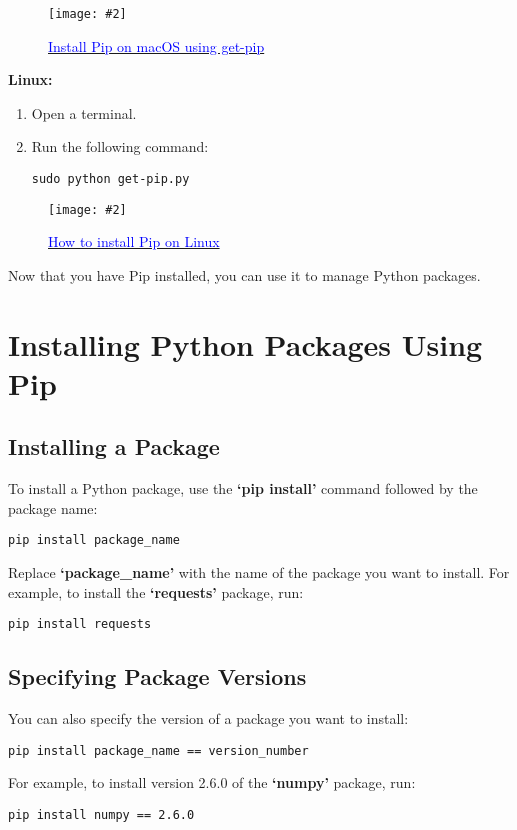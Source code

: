 \documentclass[a4paper, 12pt]{report}
\newcommand{\commandbox}[1]{%
    \begin{tcolorbox}[colback=green!10, colframe=green!50!black, rounded corners]
        #1
    \end{tcolorbox}%
}
\newcommand{\addimage}[4][]{%
    \begin{figure}[ht]
        \centering
        \texttt{[image: \#2]}
        \caption{#3}
        \label{#4}
    \end{figure}%
}
\begin{document}
        \addimage[width=0.8\textwidth]{getPipMac.png}{\href{https://phoenixnap.com/kb/wp-content/uploads/2021/09/install-pip-via-get-pip-py.png}{\textcolor{blue}{Install Pip on macOS using get-pip}}}{fig:macOS get-pip}
        
        \textbf{Linux:}
            \begin{enumerate}
                \item Open a terminal.
                \item Run the following command:
                \commandbox{\texttt{sudo python get-pip.py}}
            \end{enumerate}

        \addimage[width=0.8\textwidth]{getPipLinux.jpg}{\href{https://linuxhint.com/wp-content/uploads/2020/09/word-image-619-768x358.png}{\textcolor{blue}{How to install Pip on Linux}}}{fig:Linux get-pip}

        Now that you have Pip installed, you can use it to manage Python packages.


    \newpage
    
    
    \section{Installing Python Packages Using Pip}
    
        \subsection{Installing a Package}
        
            To install a Python package, use the \textbf{`pip install'} command followed by the package name:
            \commandbox{\texttt{pip install package\_name}}

            Replace \textbf{`package\_name'} with the name of the package you want to install. For example, to install the \textbf{`requests'} package, run:
            \commandbox{\texttt{pip install requests}}
    
        \subsection{Specifying Package Versions}
        
            You can also specify the version of a package you want to install:
            \commandbox{\texttt{pip install package\_name == version\_number}}

            For example, to install version 2.6.0 of the \textbf{`numpy'} package, run:
            \commandbox{\texttt{pip install numpy == 2.6.0}}
\end{document}
